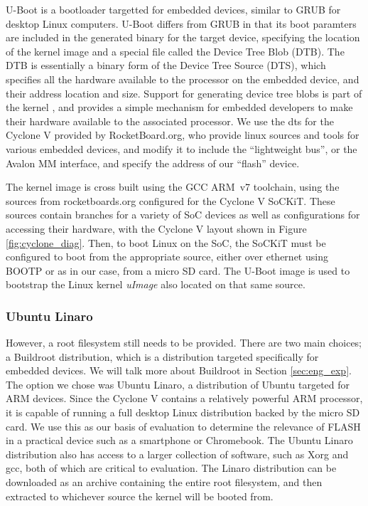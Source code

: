 \documentclass{sig-alternate-10pt}
\begin{document}
U-Boot is a bootloader targetted for embedded devices, similar to GRUB for
desktop Linux computers. U-Boot differs from GRUB in that its boot paramters
are included in the generated binary for the target device, specifying the
location of the kernel image and a special file called the Device Tree Blob
(DTB). The DTB is essentially a binary form of the Device Tree Source (DTS),
which specifies all the hardware available to the processor on the embedded
device, and their address location and size. Support for generating device
tree blobs is part of the kernel \cite{dts_linux}, and provides a simple
mechanism for embedded developers to make their hardware available to the
associated processor. We use the dts for the Cyclone V provided by
RocketBoard.org, who provide linux sources and tools for various embedded
devices, and modify it to include the ``lightweight bus'', or the Avalon MM
interface, and specify the address of our ``flash'' device.

The kernel image is cross built using the GCC ARM~v7 toolchain, using the
sources from rocketboards.org configured for the Cyclone V SoCKiT. These
sources contain branches for a variety of SoC devices as well as
configurations for accessing their hardware, with the Cyclone V layout shown
in Figure \ref{fig:cyclone_diag}. Then, to boot Linux on the SoC, the SoCKiT
must be configured to boot from the appropriate source, either over ethernet
using BOOTP or as in our case, from a micro SD card. The U-Boot image is
used to bootstrap the Linux kernel \emph{uImage} also located on that same
source. 

\subsubsection{Ubuntu Linaro}
\label{subsubsec:linaro}
However, a root filesystem still needs to be provided. There are two main choices; a Buildroot distribution, which is a distribution targeted specifically for embedded devices. We will talk more about Buildroot in Section \ref{sec:eng_exp}. The option we chose was Ubuntu Linaro, a distribution of Ubuntu targeted for ARM devices. Since the Cyclone V contains a relatively powerful ARM processor, it is capable of running a full desktop Linux distribution backed by the micro SD card. We use this as our basis of evaluation to determine the relevance of FLASH in a practical device such as a smartphone or Chromebook. The Ubuntu Linaro distribution also has access to a larger collection of software, such as Xorg and gcc, both of which are critical to evaluation. The Linaro distribution can be downloaded as an archive containing the entire root filesystem, and then extracted to whichever source the kernel will be booted from.
\end{document}

